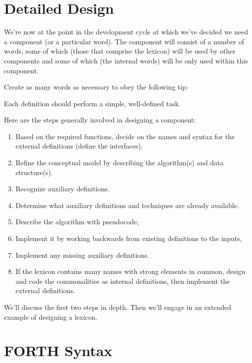 \blackline{1ex}

{\othersidetrue\section{Detailed Design}}

We're now at the point in the development cycle at which we've decided
we need a component (or a particular word). The component will consist
of a number of words, some of which (those that comprise the lexicon) will
be used by other components and some of which (the internal words) will
be only used within this component.

Create as many words as necessary to obey the following tip:
\begin{tip}
Each definition should perform a simple, well-defined task.
\end{tip}
Here are the steps generally involved in designing a component:
\begin{enumerate}
\item Based on the required functions, decide on the names and syntax for the
   external definitions (define the interfaces).
\item Refine the conceptual model by describing the algorithm(s) and data
   structure(s).
\item Recognize auxiliary definitions.
\item Determine what auxiliary definitions and techniques are already available.
\item Describe the algorithm with pseudocode,
\item Implement it by working backwards from existing definitions to the inputs,
\item Implement any missing auxiliary definitions.
\item If the lexicon contains many names with strong elements in common,
   design and code the commonalities as internal definitions, then implement
   the external definitions.
\end{enumerate}
We'll discuss the first two steps in depth. Then we'll engage in an
extended example of designing a lexicon.

\section{FORTH Syntax}

